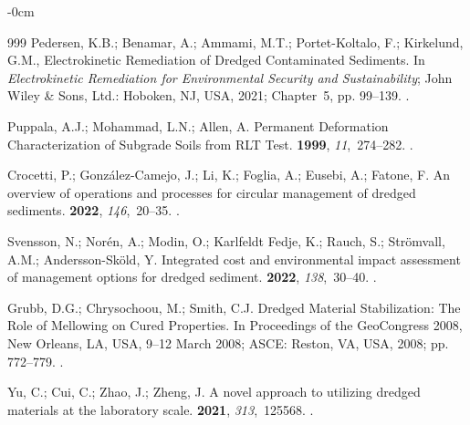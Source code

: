 \documentclass[sustainability,article,accept,pdftex,moreauthors]{Definitions/mdpi}
\begin{document}
{{\begin{adjustwidth}{-\extralength}{0cm}
\begin{thebibliography}{999}
Pedersen, K.B.; Benamar, A.; Ammami, M.T.; Portet-Koltalo, F.; Kirkelund, G.M.,
  Electrokinetic Remediation of Dredged Contaminated Sediments.
\newblock In {\em Electrokinetic Remediation for Environmental Security and
  Sustainability}; John Wiley \& Sons, Ltd.:  {Hoboken, NJ, USA,} 
  2021; Chapter~5, pp. 99--139.
.

Puppala, A.J.; Mohammad, L.N.; Allen, A.
\newblock Permanent Deformation Characterization of Subgrade Soils from RLT
  Test.
 {\bf 1999}, {\em
  11},~274--282.
.

Crocetti, P.; González-Camejo, J.; Li, K.; Foglia, A.; Eusebi, A.; Fatone, F.
\newblock An overview of operations and processes for circular management of
  dredged sediments.
 {\bf 2022}, {\em 146},~20--35.
.

Svensson, N.; Norén, A.; Modin, O.; {Karlfeldt Fedje}, K.; Rauch, S.;
  Strömvall, A.M.; Andersson-Sköld, Y.
\newblock Integrated cost and environmental impact assessment of management
  options for dredged sediment.
 {\bf 2022}, {\em 138},~30--40.
.

Grubb, D.G.; Chrysochoou, M.; Smith, C.J. Dredged Material Stabilization: The
  Role of Mellowing on Cured Properties.\linebreak 
\newblock In Proceedings of the GeoCongress 2008, New Orleans, LA, USA, 9--12 March 2008; %
  ASCE: Reston, VA, USA,  2008; pp. 772--779.
.

Yu, C.; Cui, C.; Zhao, J.; Zheng, J.
\newblock A novel approach to utilizing dredged materials at the laboratory
  scale.
 {\bf 2021}, {\em
  313},~125568.
.


\end{thebibliography}
\end{adjustwidth}}}
\end{document}

